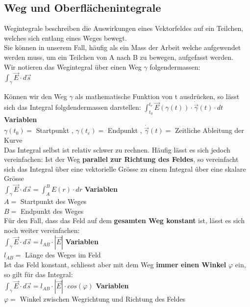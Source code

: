 \newpage
\subsection{Weg und Oberflächenintegrale}

\begingl
Wegintegrale beschreiben die Auswirkungen eines Vektorfeldes auf ein Teilchen, welches sich entlang eines Weges bewegt. \\
Sie können in unserem Fall, häufig als ein Mass der Arbeit welche aufgewendet werden muss, um ein Teilchen von A nach B zu bewegen, aufgefasst werden. \\

Wir notieren das Wegintegral über einen Weg $\gamma$ folgendermassen: \\
\formulaBegin
$ \displaystyle \int_\gamma \vec{E} \cdot d\vec{s}$
\formulaEnd

Können wir den Weg $\gamma$ als mathematische Funktion von t ausdrücken, so lässt sich das Integral folgdendermassen darstellen:
\formulaBegin
$\displaystyle \int_{t_0}^{t_e} \vec{E}(\gamma(t)) \cdot \dot{\vec{\gamma}}(t) \cdot dt$
\formulaEnd
\textbf{Variablen} \\
$\gamma(t_0) = $ Startpunkt ,  $\gamma(t_e) = $ Endpunkt , $ \dot{\vec{\gamma}}(t) = $ Zeitliche Ableitung der Kurve \\


Das Integral selbst ist relativ schwer zu rechnen. Häufig lässt es sich jedoch vereinfachen:
Ist der Weg \textbf{parallel zur Richtung des Feldes}, so vereinfacht sich das Integral über eine vektorielle Grösse zu einem Integral über eine skalare Grösse \\
\formulaBegin
$\displaystyle \int_\gamma \vec{E} \cdot d\vec{s} = \int_A^B E(r) \cdot dr $
\formulaEnd
\textbf{Variablen} \\
$ A  = $ Startpunkt des Weges\\
$ B = $ Endpunkt des Weges \\

Für den Fall, dass das Feld auf dem \textbf{gesamten Weg konstant} ist, lässt es sich noch weiter vereinfachen: \\
\formulaBegin
$\displaystyle \int_\gamma \vec{E} \cdot d\vec{s} = l_{AB} \cdot |\vec{E}|$
\formulaEnd
\textbf{Variablen} \\
$ l_{AB}  = $ Länge des Weges im Feld\\
Ist das Feld konstant, schliesst aber mit dem Weg \textbf{immer einen Winkel} $\varphi$ ein, so gilt für das Integral: \\
\formulaBegin
$\displaystyle \int_\gamma \vec{E} \cdot d\vec{s} = l_{AB} \cdot |\vec{E}|\cdot cos(\varphi)$
\formulaEnd
\textbf{Variablen} \\
$ \varphi  = $  Winkel zwischen Wegrichtung und Richtung des Feldes\\

